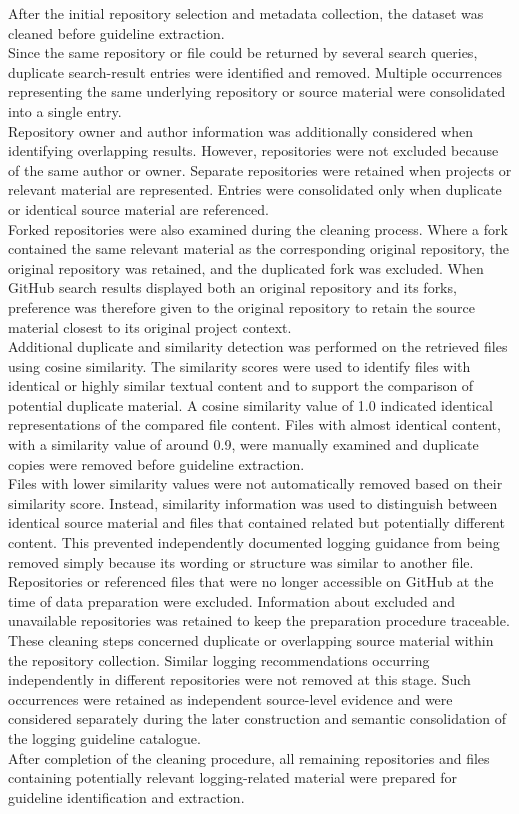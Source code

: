 After the initial repository selection and metadata collection, the dataset was
cleaned before guideline extraction.
\\
Since the same repository or file could be returned by several search queries,
duplicate search-result entries were identified and removed. Multiple occurrences
representing the same underlying repository or source material were consolidated
into a single entry.
\\
Repository owner and author information was additionally considered when identifying
overlapping results. However, repositories were not excluded because of
the same author or owner. Separate repositories were retained when projects 
or relevant material are represented. Entries were consolidated
only when duplicate or identical source material are referenced.
\\
Forked repositories were also examined during the cleaning process. Where a fork
contained the same relevant material as the corresponding original repository, the
original repository was retained, and the duplicated fork was excluded. When GitHub
search results displayed both an original repository and its forks, preference was
therefore given to the original repository to retain the source material
closest to its original project context.
\\
Additional duplicate and similarity detection was performed on the retrieved files
using cosine similarity. The similarity scores were used to identify files with
identical or highly similar textual content and to support the comparison of
potential duplicate material. A cosine similarity value of 1.0 indicated identical
representations of the compared file content. Files with almost identical content,
with a similarity value of around 0.9, were manually examined and duplicate
copies were removed before guideline extraction.
\\
Files with lower similarity values were not automatically removed based on their similarity score. Instead, similarity information was used to distinguish
between identical source material and files that contained related but potentially
different content. This prevented independently documented logging guidance from
being removed simply because its wording or structure was similar to another file.
\\
Repositories or referenced files that were no longer accessible on GitHub at the time
of data preparation were excluded. Information about excluded and unavailable
repositories was retained to keep the preparation procedure traceable.
\\
These cleaning steps concerned duplicate or overlapping source material within the
repository collection. Similar logging recommendations occurring independently in
different repositories were not removed at this stage. Such occurrences were retained
as independent source-level evidence and were considered separately during the later
construction and semantic consolidation of the logging guideline catalogue.
\\
After completion of the cleaning procedure, all remaining repositories and files
containing potentially relevant logging-related material were prepared for guideline
identification and extraction.

